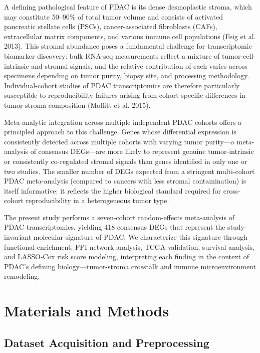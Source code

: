 \documentclass[
  12pt,
]{article}
\begin{document}
A defining pathological feature of PDAC is its dense desmoplastic
stroma, which may constitute 50--90\% of total tumor volume and consists
of activated pancreatic stellate cells (PSCs), cancer-associated
fibroblasts (CAFs), extracellular matrix components, and various immune
cell populations (Feig et al. 2013). This stromal abundance poses a
fundamental challenge for transcriptomic biomarker discovery: bulk
RNA-seq measurements reflect a mixture of tumor-cell-intrinsic and
stromal signals, and the relative contribution of each varies across
specimens depending on tumor purity, biopsy site, and processing
methodology. Individual-cohort studies of PDAC transcriptomics are
therefore particularly susceptible to reproducibility failures arising
from cohort-specific differences in tumor-stroma composition (Moffitt et
al. 2015).

Meta-analytic integration across multiple independent PDAC cohorts
offers a principled approach to this challenge. Genes whose differential
expression is consistently detected across multiple cohorts with varying
tumor purity---a meta-analysis of consensus DEGs---are more likely to
represent genuine tumor-intrinsic or consistently co-regulated stromal
signals than genes identified in only one or two studies. The smaller
number of DEGs expected from a stringent multi-cohort PDAC meta-analysis
(compared to cancers with less stromal contamination) is itself
informative: it reflects the higher biological standard required for
cross-cohort reproducibility in a heterogeneous tumor type.

The present study performs a seven-cohort random-effects meta-analysis
of PDAC transcriptomics, yielding 418 consensus DEGs that represent the
study-invariant molecular signature of PDAC. We characterize this
signature through functional enrichment, PPI network analysis, TCGA
validation, survival analysis, and LASSO-Cox risk score modeling,
interpreting each finding in the context of PDAC's defining
biology---tumor-stroma crosstalk and immune microenvironment remodeling.

\section{Materials and Methods}\label{materials-and-methods}

\subsection{Dataset Acquisition and
Preprocessing}\label{dataset-acquisition-and-preprocessing}
\end{document}
